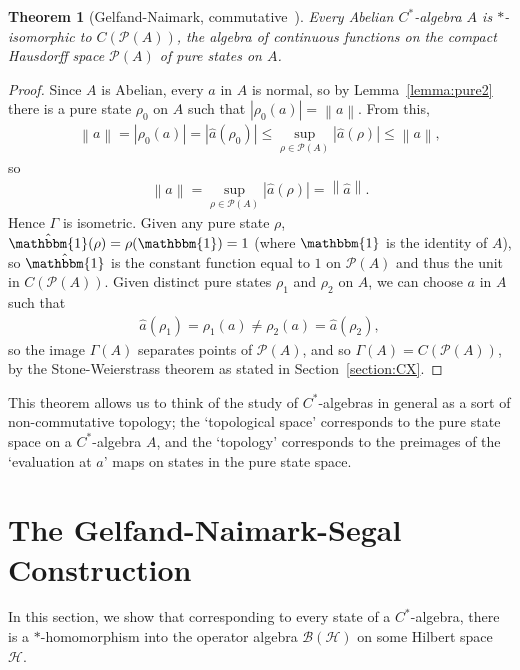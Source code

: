 \documentclass[11pt,a4paper]{report}
\theoremstyle{plain}
\newtheorem{thm}{Theorem}
\theoremstyle{definition}
\newcommand{\1}{\mathbbm{1}}
\renewcommand{\H}{\mathcal{H}}
\newcommand{\B}{\mathcal{B}}
\renewcommand{\P}[1]{\mathscr{P}(#1)}
\begin{document}
\begin{thm}[{Gelfand-Naimark, commutative~\cite[4.4.3]{kadison83}}] \label{thm:gnc}
	Every Abelian $C^\ast$-algebra $A$ is $\ast$-isomorphic to $C(\P A)$, the 
	algebra of continuous functions on the compact Hausdorff space $\P A$ of pure 
	states on $A$.

\end{thm}
\begin{proof}
	Since $A$ is Abelian, every $a$ in $A$ is normal, so by Lemma~\ref{lemma:pure2} 
	there is a pure state $\rho_0$ on $A$ such that $|\rho_0(a)|=\left\|a\right\|$. 
	From this, 
	\begin{align*}
			\left\|a\right\|	
		=|\rho_0(a)|
		=|\hat a(\rho_0)|
		\leq \sup_{\rho\in\P A}|\hat a(\rho)| 
		\leq \left\|a\right\|,
	\end{align*}
	so 
	\begin{align*}
		\left\|a\right\|=\sup_{\rho\in\P A} |\hat a (\rho)| = \left\|\hat a\right\|.
	\end{align*}
	Hence $\Gamma$ is isometric.
	Given any pure state $\rho$, $\hat \1(\rho) = \rho(\1) = 1$ (where $\1$ is the 
	identity of $A$), so $\hat\1$ is the constant function equal to $1$ on $\P A$ 
	and thus the unit in $C(\P A)$. Given distinct pure states $\rho_1$ and $\rho_2$ 
	on $A$, we can choose $a$ in $A$ such that 
	\begin{align*}
		\hat a(\rho_1) = \rho_1(a) \not= \rho_2(a) = \hat a(\rho_2),
	\end{align*}
	so the image $\Gamma(A)$ separates points of $\P A$, and so $\Gamma(A)=C(\P A)$, 
	by the Stone-Weierstrass theorem as stated in Section~\ref{section:CX}.

\end{proof}

This theorem allows us to think of the study of $C^\ast$-algebras in general as 
a sort of non-commutative topology; the `topological space' corresponds to the 
pure state space on a $C^\ast$-algebra $A$, and the `topology' corresponds to 
the preimages of the `evaluation at $a$' maps on states in the pure state space.



	
\section{The Gelfand-Naimark-Segal Construction}
In this section, we show that corresponding to every state of a 
$C^\ast$-algebra, there is a $\ast$-homomorphism into the operator algebra 
$\B(\H)$ on some Hilbert space $\H$. 
\end{document}
